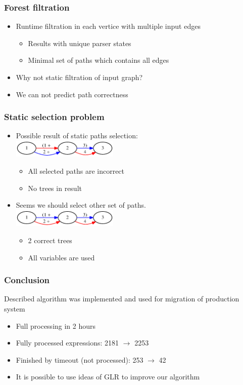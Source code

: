 \documentclass{beamer}
\begin{document}
\begin{frame}
	\transwipe[direction=90]
	\frametitle{Forest filtration}
	\begin{itemize}
	\item Runtime filtration in each vertice with multiple input edges
	\begin{itemize}
    	\item Results with unique parser states
    	\item Minimal set of paths which contains all edges
	\end{itemize}
    \item Why not static filtration of input graph?
    \item We can not predict path correctness 
	\end{itemize}
\end{frame}

\begin{frame}
	\transwipe[direction=90]
	\frametitle{Static selection problem}
	\begin{itemize}
	\item Possible result of static paths selection: \\ {\includegraphics[width = 0.4\textwidth]{./dot/static1.eps}}
	\begin{itemize}
    	\item All selected paths are incorrect
    	\item No trees in result
	\end{itemize}
	\pause
	\item Seems we should select other set of paths.\\
	{\includegraphics[width = 0.4\textwidth]{./dot/static2.eps}}
	\begin{itemize}
    	\item 2 correct trees
    	\item All variables are used
	\end{itemize}
	\end{itemize}
\end{frame}


\begin{frame}
	\transwipe[direction=90]
	\frametitle{Conclusion}
	Described algorithm was implemented and used for migration of production system
	\begin{itemize}
	    \item Full processing in 2 hours
		\item Fully processed expressions: 2181 $\rightarrow$ 2253
		\item Finished by timeout (not processed): 253 $\rightarrow$ 42
        \item It is possible to use ideas of GLR to improve our algorithm
	\end{itemize}
\end{frame}
\end{document}
